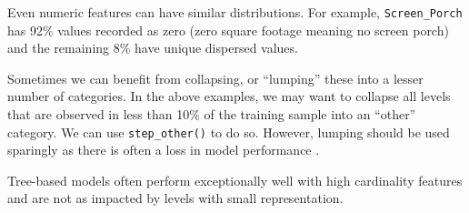 \documentclass[]{krantz}
\makeatletter
\newenvironment{Shaded}{\begin{snugshade}}{\end{snugshade}}
\newcommand{\CommentTok}[1]{\textcolor[rgb]{0.37,0.37,0.37}{\textit{#1}}}
\newcommand{\KeywordTok}[1]{\textcolor[rgb]{0.27,0.27,0.27}{\textbf{#1}}}
\newcommand{\NormalTok}[1]{#1}
\newcommand{\OperatorTok}[1]{\textcolor[rgb]{0.43,0.43,0.43}{\textbf{#1}}}
\newcommand{\StringTok}[1]{\textcolor[rgb]{0.5,0.5,0.5}{#1}}
\newenvironment{kframe}{%
\medskip{}
\setlength{\fboxsep}{.8em}
 \def\at@end@of@kframe{}%
 \ifinner\ifhmode%
  \def\at@end@of@kframe{\end{minipage}}%
  \begin{minipage}{\columnwidth}%
 \fi\fi%
 \def\FrameCommand##1{\hskip\@totalleftmargin \hskip-\fboxsep
 \colorbox{shadecolor}{##1}\hskip-\fboxsep
     \hskip-\linewidth \hskip-\@totalleftmargin \hskip\columnwidth}%
 \MakeFramed {\advance\hsize-\width
   \@totalleftmargin\z@ \linewidth\hsize
   \@setminipage}}%
 {\par\unskip\endMakeFramed%
 \at@end@of@kframe}
\newenvironment{block}[1]
  {
  \begin{itemize}
  \renewcommand{\labelitemi}{
    \raisebox{-.7\height}[0pt][0pt]{
      {\setkeys{Gin}{width=3em,keepaspectratio}\texttt{[image: icons/\#1]}}
    }
  }
  \setlength{\fboxsep}{1em}
  \begin{kframe}
  \item
  }
  {
  \end{kframe}
  \end{itemize}
  }
\newenvironment{tip}
  {\begin{block}{tip}}
  {\end{block}}
\renewenvironment{Shaded}{\begin{kframe}}{\end{kframe}}
\makeatother
\begin{document}
Even numeric features can have similar distributions. For example, \texttt{Screen\_Porch} has 92\% values recorded as zero (zero square footage meaning no screen porch) and the remaining 8\% have unique dispersed values.

\begin{Shaded}
\end{Shaded}

Sometimes we can benefit from collapsing, or ``lumping'' these into a lesser number of categories. In the above examples, we may want to collapse all levels that are observed in less than 10\% of the training sample into an ``other'' category. We can use \texttt{step\_other()} to do so. However, lumping should be used sparingly as there is often a loss in model performance \citep{apm}.

\begin{tip}
Tree-based models often perform exceptionally well with high cardinality
features and are not as impacted by levels with small representation.
\end{tip}
\end{document}
